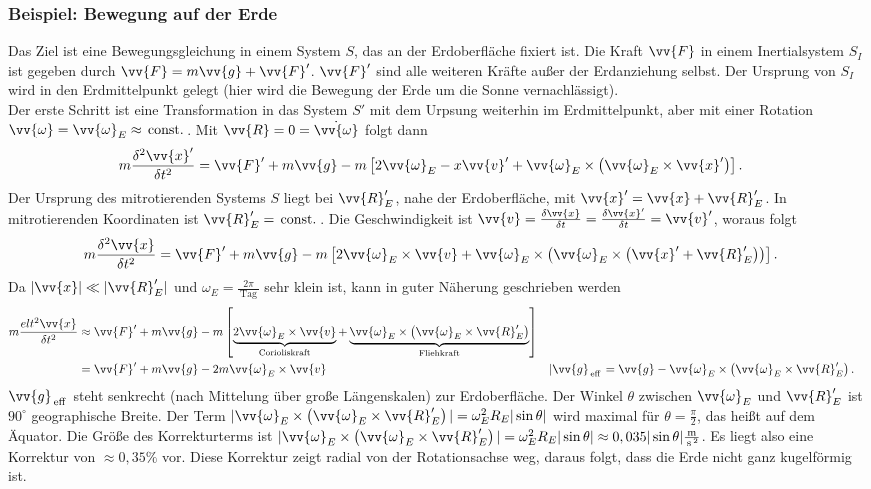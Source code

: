\documentclass[a4paper,12pt]{article}
\numberwithin{equation}{section}
\begin{document}
\subsubsection{Beispiel: Bewegung auf der Erde}
Das Ziel ist eine Bewegungsgleichung in einem System $S$, das an der Erdoberfläche fixiert ist. Die Kraft $\vv{F}$ in einem Inertialsystem $S_I$ ist gegeben durch $\vv{F}=m\vv{g}+\vv{F}'$. $\vv{F}'$ sind alle weiteren Kräfte außer der Erdanziehung selbst. Der Ursprung von $S_I$ wird in den Erdmittelpunkt gelegt (hier wird die Bewegung der Erde um die Sonne vernachlässigt).\\\indent
Der erste Schritt ist eine Transformation in das System $S'$ mit dem Urpsung weiterhin im Erdmittelpunkt, aber mit einer Rotation $\vv{\omega }=\vv{\omega }_E\approx \,\text{const.}\,$. Mit $\vv{R}=0=\dot{\vv{\omega }}$ folgt dann
\begin{align*}
        m\dfrac{\delta ^2\vv{x}'}{\delta t^2}&=\vv{F}'+m\vv{g}-m\left[2\vv{\omega }_E-x\vv{v}'+\vv{\omega }_E\times \left(\vv{\omega }_E\times \vv{x}'\right)\right]
.\end{align*}
Der Ursprung des mitrotierenden Systems $S$ liegt bei $\vv{R}_E'$, nahe der Erdoberfläche, mit $\vv{x}'=\vv{x}+\vv{R}_E'$. In mitrotierenden Koordinaten ist $\vv{R}_E'=\,\text{const.}\,$. Die Geschwindigkeit ist $\vv{v}=\tfrac{\delta \vv{x}}{\delta t}=\tfrac{\delta \vv{x}'}{\delta t}=\vv{v}'$, woraus folgt
\begin{align*}
        m\dfrac{\delta ^2\vv{x}}{\delta t^2}&=\vv{F}'+m\vv{g}-m\left[2\vv{\omega }_E\times \vv{v}+\vv{\omega }_E\times \left(\vv{\omega }_E\times \left(\vv{x}'+\vv{R}_E'\right)\right)\right]
.\end{align*}
Da $|\vv{x}|\ll |\vv{R}_E'|$ und $\omega _E=\tfrac{2\pi }{\,\text{Tag}\,}$ sehr klein ist, kann in guter Näherung geschrieben werden
\begin{align*}
        m\dfrac{elt^2\vv{x}}{\delta t^2}&\approx \vv{F}'+m\vv{g}-m\left[\underbrace{2\vv{\omega }_E\times \vv{v}}_{\,\text{Corioliskraft}\,}+\underbrace{\vv{\omega }_E\times \left(\vv{\omega }_E\times \vv{R}_E'\right)}_{\,\text{Fliehkraft}\,}\right]\\
                                        &=\vv{F}'+m\vv{g}-2m\vv{\omega }_E\times \vv{v}&|\vv{g}_{\,\text{eff}\,}&=\vv{g}-\vv{\omega }_E\times \left(\vv{\omega }_E\times \vv{R}_E'\right)
.\end{align*}
$\vv{g}_{\,\text{eff}\,}$ steht senkrecht (nach Mittelung über große Längenskalen) zur Erdoberfläche. Der Winkel $\theta $ zwischen $\vv{\omega }_E$ und $\vv{R}_E'$ ist $90^\circ$ geographische Breite. Der Term $|\vv{\omega }_E\times \left(\vv{\omega }_E\times \vv{R}_E'\right)|=\omega _E^2R_E|\sin \theta |$ wird maximal für $\theta =\tfrac{\pi }{2}$, das heißt auf dem Äquator. Die Größe des Korrekturterms ist $|\vv{\omega }_E\times \left(\vv{\omega }_E\times \vv{R}_E'\right)|=\omega _E^2R_E|\sin \theta |\approx 0,035|\sin \theta |\tfrac{\,\text{m}\,}{\,\text{s}\,^2}$. Es liegt also eine Korrektur von $\approx 0,35\% $ vor. Diese Korrektur zeigt radial von der Rotationsachse weg, daraus folgt, dass die Erde nicht ganz kugelförmig ist.\\\indent
\end{document}
